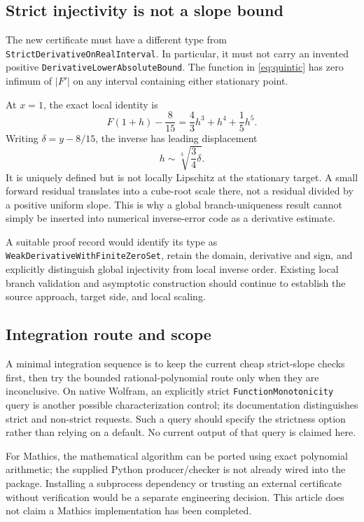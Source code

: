 \documentclass[11pt,letterpaper]{article}
\newcommand{\code}[1]{\nolinkurl{#1}}
\begin{document}
\subsection{Strict injectivity is not a slope bound}
The new certificate must have a different type from \code{StrictDerivativeOnRealInterval}. In particular, it must not carry an invented positive \code{DerivativeLowerAbsoluteBound}. The function in \eqref{eq:quintic} has zero infimum of \(|F'|\) on any interval containing either stationary point.

At \(x=1\), the exact local identity is
\begin{equation}
 F(1+h)-\frac{8}{15}=\frac43h^3+h^4+\frac15h^5.
 \label{eq:stationaryexpansion}
\end{equation}
Writing \(\delta=y-8/15\), the inverse has leading displacement
\[
 h\sim\sqrt[3]{\frac34\delta}.
\]
It is uniquely defined but is not locally Lipschitz at the stationary target. A small forward residual translates into a cube-root scale there, not a residual divided by a positive uniform slope. This is why a global branch-uniqueness result cannot simply be inserted into numerical inverse-error code as a derivative estimate.

A suitable proof record would identify its type as \code{WeakDerivativeWithFiniteZeroSet}, retain the domain, derivative and sign, and explicitly distinguish global injectivity from local inverse order. Existing local branch validation and asymptotic construction should continue to establish the source approach, target side, and local scaling.

\subsection{Integration route and scope}
A minimal integration sequence is to keep the current cheap strict-slope checks first, then try the bounded rational-polynomial route only when they are inconclusive. On native Wolfram, an explicitly strict \code{FunctionMonotonicity} query is another possible characterization control; its documentation distinguishes strict and non-strict requests. Such a query should specify the strictness option rather than relying on a default. No current output of that query is claimed here.\cite{wlmono}

For Mathics, the mathematical algorithm can be ported using exact polynomial arithmetic; the supplied Python producer/checker is not already wired into the package. Installing a subprocess dependency or trusting an external certificate without verification would be a separate engineering decision. This article does not claim a Mathics implementation has been completed.
\end{document}
